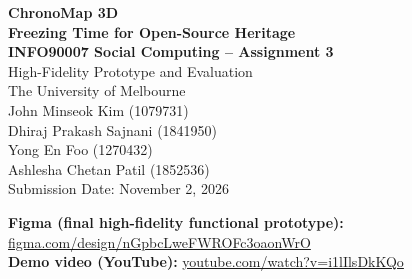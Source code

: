\documentclass[11pt,a4paper]{article}
\newif\ifdraftmode
\newcommand{\marker}[2]{\ifdraftmode\textcolor{#1}{\small\sffamily[#2]}\fi}
\newcommand{\VERIFY}[1]{\marker{blue!70!black}{VERIFY: #1}}
\begin{document}
\begin{center}
\vspace*{1.5cm}

{\LARGE\bfseries ChronoMap 3D}\\[0.5em]
{\large\bfseries Freezing Time for Open-Source Heritage}\\[1.4em]

{\large\bfseries INFO90007 Social Computing -- Assignment 3}\\[0.4em]
{\large High-Fidelity Prototype and Evaluation}\\[1.2em]

{The University of Melbourne}\\[1.4em]

John Minseok Kim (1079731)\\
Dhiraj Prakash Sajnani (1841950)\\
Yong En Foo (1270432)\\
Ashlesha Chetan Patil (1852536)\\[1.6em]

Submission Date: November 2, 2026

\vspace{1.6cm}

\begin{minipage}{0.86\textwidth}
\small
\textbf{Figma (final high-fidelity functional prototype):}\\
\href{https://www.figma.com/design/nGpbcLweFWROFc3oaonWrO/}{figma.com/design/nGpbcLweFWROFc3oaonWrO}\\
\VERIFY{open in a logged-out private window; sharing must be ``Anyone with the link: can view'';
rename the file so it no longer says ``Low-Fi''; add a link to the Present view of the final flow}

\medskip
\textbf{Demo video (YouTube):}
\href{https://www.youtube.com/watch?v=i1lIlsDkKQo}{youtube.com/watch?v=i1lIlsDkKQo}\\
\VERIFY{opens without sign-in; not flagged ``Made for Kids''}
\end{minipage}

\end{center}

\vfill

\begin{center}
\end{center}
\end{document}
